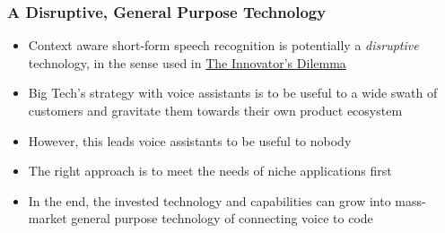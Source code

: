 \documentclass{beamer}
\begin{document}
\begin{frame}
\frametitle{A Disruptive, General Purpose Technology}
\begin{itemize}
    \item Context aware short-form speech recognition is potentially a \textit{disruptive} technology, in the sense used in \href{https://www.amazon.com/Innovators-Dilemma-Technologies-Management-Innovation/dp/1633691780}{The Innovator's Dilemma}
    \item Big Tech's strategy with voice assistants is to be useful to a wide swath of customers and gravitate them towards their own product ecosystem
    \item However, this leads voice assistants to be useful to nobody
    \item The right approach is to meet the needs of niche applications first
    \item In the end, the invested technology and capabilities can grow into mass-market general purpose technology of connecting voice to code 
\end{itemize}

\end{frame}
\end{document}
